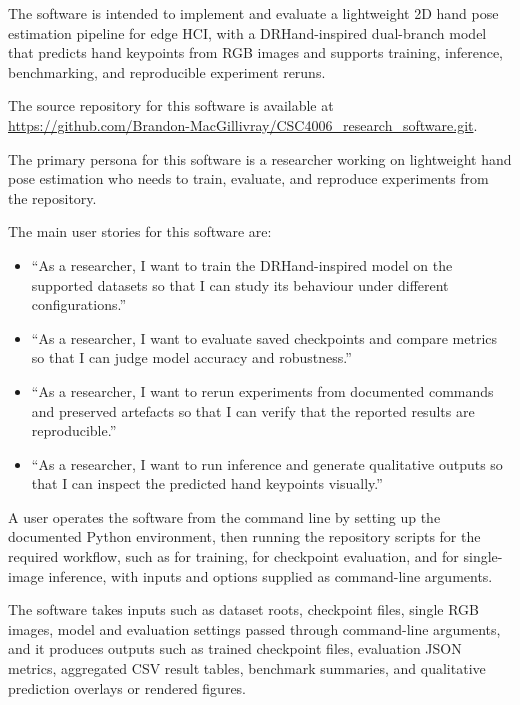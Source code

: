 ﻿\documentclass[11pt,a4paper]{article}
\begin{document}
The software is intended to implement and evaluate a lightweight 2D hand pose
estimation pipeline for edge HCI, with a DRHand-inspired dual-branch model
that predicts hand keypoints from RGB images and supports training, inference,
benchmarking, and reproducible experiment reruns.

\medskip

\noindent The source repository for this software is available at
\url{https://github.com/Brandon-MacGillivray/CSC4006_research_software.git}.

\medskip

\noindent The primary persona for this software is a researcher working on
lightweight hand pose estimation who needs to train, evaluate, and reproduce
experiments from the repository.

\medskip

\noindent The main user stories for this software are:
\begin{itemize}
    \item ``As a researcher, I want to train the DRHand-inspired model on the
    supported datasets so that I can study its behaviour under different
    configurations.''
    \item ``As a researcher, I want to evaluate saved checkpoints and compare
    metrics so that I can judge model accuracy and robustness.''
    \item ``As a researcher, I want to rerun experiments from documented
    commands and preserved artefacts so that I can verify that the reported
    results are reproducible.''
    \item ``As a researcher, I want to run inference and generate qualitative
    outputs so that I can inspect the predicted hand keypoints visually.''
\end{itemize}

\noindent
A user operates the software from the command line by setting up the
documented Python environment, then running the repository scripts for the
required workflow, such as  for training,
 for checkpoint evaluation, and
 for single-image inference, with inputs and
options supplied as command-line arguments.

\medskip

\noindent
The software takes inputs such as dataset roots, checkpoint files, single RGB
images, model and evaluation settings passed through command-line arguments,
and it produces outputs such as trained checkpoint files, evaluation JSON
metrics, aggregated CSV result tables, benchmark summaries, and qualitative
prediction overlays or rendered figures.
\end{document}
